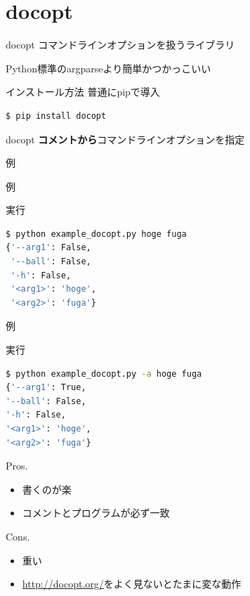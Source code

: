 \documentclass[12pt, xetex, xcolor=pdftex, dvipsnames]{beamer}
\begin{document}
\section{docopt}
\begin{frame}{docopt}
    コマンドラインオプションを扱うライブラリ

    Python標準のargparseより簡単かつかっこいい
\end{frame}
\begin{frame}[fragile]{インストール方法}
    普通にpipで導入
    \begin{lstlisting}[language=Bash]
$ pip install docopt
    \end{lstlisting}
\end{frame}
\begin{frame}{docopt}
    \textbf{\alert{コメントから}}コマンドラインオプションを指定
\end{frame}
\begin{frame}[fragile]{例}
    
\end{frame}
\begin{frame}[fragile]{例}
    

    実行
    \begin{lstlisting}[language=Bash]
$ python example_docopt.py hoge fuga
{'--arg1': False,
 '--ball': False,
 '-h': False,
 '<arg1>': 'hoge',
 '<arg2>': 'fuga'}
    \end{lstlisting}
\end{frame}
\begin{frame}[fragile]{例}
    

    実行
    \begin{lstlisting}[language=Bash]
$ python example_docopt.py -a hoge fuga
{'--arg1': True,
'--ball': False,
'-h': False,
'<arg1>': 'hoge',
'<arg2>': 'fuga'}
    \end{lstlisting}
\end{frame}
\begin{frame}
    \begin{block}{Pros.}
        \begin{itemize}
            \item 書くのが楽
            \item コメントとプログラムが必ず一致
        \end{itemize}
    \end{block}
    \begin{block}{Cons.}
        \begin{itemize}
            \item 重い
            \item \url{http://docopt.org/}をよく見ないとたまに変な動作
        \end{itemize}
    \end{block}
\end{frame}
\end{document}
